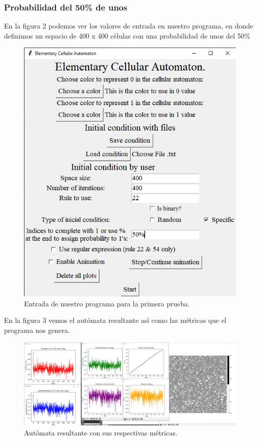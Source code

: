 \documentclass[11pt]{article}
\begin{document}
		\subsubsection{Probabilidad del 50\% de unos}
		En la figura 2 podemos ver los valores de entrada en nuestro programa, en donde definimos un espacio de 400 x 400 células con una probabilidad de unos del 50\%		
		\begin{figure}[H]
			\centering
			\includegraphics[scale=0.5]{resources/RegEx22/50_prob_entrada.png}
			\caption{Entrada de nuestro programa para la primera prueba.}\label{fig:picture}
		\end{figure}
		En la figura 3 vemos el autómata resultante así como las métricas que el programa nos genera.
		\begin{figure}[H]
			\includegraphics[scale=0.26]{resources/RegEx22/50_prob_result.png}
			\caption{Autómata resultante con sus respectivas métricas.}\label{fig:picture}
		\end{figure}		
\end{document}
